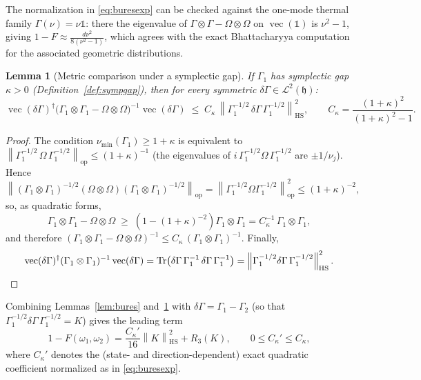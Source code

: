 \documentclass[11pt,a4paper]{article}
\newcommand{\idm}{\mathds{1}}}{\newcommand{\idm}{\mathbf{1}}}
\theoremstyle{plain}
\newtheorem{lemma}[theorem]{Lemma}
\theoremstyle{definition}
\theoremstyle{remark}
\newcommand{\hh}{\mathfrak{h}}
\newcommand{\opnorm}[1]{\left\lVert #1 \right\rVert_{\mathrm{op}}}
\newcommand{\hsnorm}[1]{\left\lVert #1 \right\rVert_{\mathrm{HS}}}
\newcommand{\Tr}{\operatorname{Tr}}
\newcommand{\Ckappa}{C_{\kappa}}
\newcommand{\vc}{\operatorname{vec}}
\begin{document}
The normalization in \eqref{eq:buresexp} can be checked against the one-mode
thermal family $\Gamma(\nu) = \nu\idm$: there the eigenvalue of
$\Gamma\otimes\Gamma - \Omega\otimes\Omega$ on $\vc(\idm)$ is $\nu^2 - 1$,
giving $1 - F \approx \frac{d\nu^2}{8(\nu^2-1)}$, which agrees with the exact
Bhattacharyya computation for the associated geometric distributions.

\begin{lemma}[Metric comparison under a symplectic gap]\label{lem:comparison}
If $\Gamma_1$ has symplectic gap $\kappa > 0$ (Definition~\ref{def:sympgap}), then
for every symmetric $\delta\Gamma \in \mathcal{L}^2(\hh)$:
\begin{equation}
\vc(\delta\Gamma)^{\dagger}\big(\Gamma_1\otimes\Gamma_1 -
\Omega\otimes\Omega\big)^{-1}\vc(\delta\Gamma)
\;\le\; \Ckappa \, \hsnorm{\Gamma_1^{-1/2}\,\delta\Gamma\,\Gamma_1^{-1/2}}^2,
\qquad \Ckappa = \frac{(1+\kappa)^2}{(1+\kappa)^2 - 1}.
\end{equation}
\end{lemma}

\begin{proof}
The condition $\nu_{\min}(\Gamma_1) \ge 1+\kappa$ is equivalent to
$\opnorm{\Gamma_1^{-1/2}\,\Omega\,\Gamma_1^{-1/2}} \le (1+\kappa)^{-1}$ (the
eigenvalues of $i\,\Gamma_1^{-1/2}\Omega\,\Gamma_1^{-1/2}$ are $\pm 1/\nu_j$).
Hence
\begin{equation}
\opnorm{(\Gamma_1\otimes\Gamma_1)^{-1/2}(\Omega\otimes\Omega)
(\Gamma_1\otimes\Gamma_1)^{-1/2}}
= \opnorm{\Gamma_1^{-1/2}\Omega\Gamma_1^{-1/2}}^2 \le (1+\kappa)^{-2},
\end{equation}
so, as quadratic forms,
\begin{equation}
\Gamma_1\otimes\Gamma_1 - \Omega\otimes\Omega
\;\ge\; \left(1 - (1+\kappa)^{-2}\right)\Gamma_1\otimes\Gamma_1
= \Ckappa^{-1}\,\Gamma_1\otimes\Gamma_1,
\end{equation}
and therefore
$(\Gamma_1\otimes\Gamma_1 - \Omega\otimes\Omega)^{-1}
\le \Ckappa\,(\Gamma_1\otimes\Gamma_1)^{-1}$. Finally,
\begin{equation}
\vc(\delta\Gamma)^{\dagger}(\Gamma_1\otimes\Gamma_1)^{-1}\vc(\delta\Gamma)
= \Tr\!\left(\delta\Gamma\,\Gamma_1^{-1}\,\delta\Gamma\,\Gamma_1^{-1}\right)
= \hsnorm{\Gamma_1^{-1/2}\delta\Gamma\,\Gamma_1^{-1/2}}^2.
\qedhere
\end{equation}
\end{proof}

Combining Lemmas~\ref{lem:bures} and~\ref{lem:comparison} with
$\delta\Gamma = \Gamma_1 - \Gamma_2$ (so that
$\Gamma_1^{-1/2}\delta\Gamma\,\Gamma_1^{-1/2} = K$) gives the leading term
\begin{equation}\label{eq:leading}
1 - F(\omega_1,\omega_2) = \frac{\Ckappa'}{16}\hsnorm{K}^2 + R_3(K),
\qquad 0 \le \Ckappa' \le \Ckappa,
\end{equation}
where $\Ckappa'$ denotes the (state- and direction-dependent) exact quadratic
coefficient normalized as in \eqref{eq:buresexp}.
\end{document}

